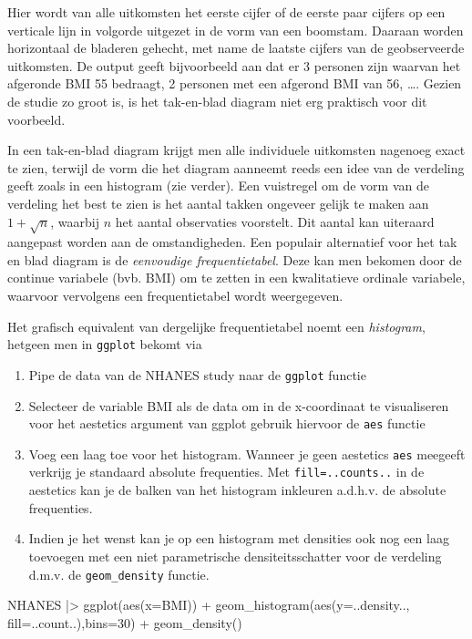 \documentclass[
  dutch,
  letterpaper,
  12pt]{book}
\newenvironment{Shaded}{\begin{snugshade}}{\end{snugshade}}
\newcommand{\AttributeTok}[1]{\textcolor[rgb]{0.40,0.45,0.13}{#1}}
\newcommand{\DecValTok}[1]{\textcolor[rgb]{0.68,0.00,0.00}{#1}}
\newcommand{\FunctionTok}[1]{\textcolor[rgb]{0.28,0.35,0.67}{#1}}
\newcommand{\NormalTok}[1]{\textcolor[rgb]{0.00,0.23,0.31}{#1}}
\newcommand{\SpecialCharTok}[1]{\textcolor[rgb]{0.37,0.37,0.37}{#1}}
\providecommand{\tightlist}{%
  \setlength{\itemsep}{0pt}\setlength{\parskip}{0pt}}
\theoremstyle{definition}
\theoremstyle{definition}
\theoremstyle{definition}
\theoremstyle{remark}
\begin{document}
Hier wordt van alle uitkomsten het eerste cijfer of de eerste paar
cijfers op een verticale lijn in volgorde uitgezet in de vorm van een
boomstam. Daaraan worden horizontaal de bladeren gehecht, met name de
laatste cijfers van de geobserveerde uitkomsten. De output geeft
bijvoorbeeld aan dat er 3 personen zijn waarvan het afgeronde BMI 55
bedraagt, 2 personen met een afgerond BMI van 56, \ldots. Gezien de
studie zo groot is, is het tak-en-blad diagram niet erg praktisch voor
dit voorbeeld.

In een tak-en-blad diagram krijgt men alle individuele uitkomsten
nagenoeg exact te zien, terwijl de vorm die het diagram aanneemt reeds
een idee van de verdeling geeft zoals in een histogram (zie verder). Een
vuistregel om de vorm van de verdeling het best te zien is het aantal
takken ongeveer gelijk te maken aan \(1 + \sqrt{n}\), waarbij \(n\) het
aantal observaties voorstelt. Dit aantal kan uiteraard aangepast worden
aan de omstandigheden. Een populair alternatief voor het tak en blad
diagram is de \emph{eenvoudige frequentietabel}. Deze kan men bekomen
door de continue variabele (bvb. BMI) om te zetten in een kwalitatieve
ordinale variabele, waarvoor vervolgens een frequentietabel wordt
weergegeven.

Het grafisch equivalent van dergelijke frequentietabel noemt een
\emph{histogram}, hetgeen men in \texttt{ggplot} bekomt via

\begin{enumerate}
\def\labelenumi{\arabic{enumi}.}
\tightlist
\item
  Pipe de data van de NHANES study naar de \texttt{ggplot} functie
\item
  Selecteer de variable BMI als de data om in de x-coordinaat te
  visualiseren voor het aestetics argument van ggplot gebruik hiervoor
  de \texttt{aes} functie
\item
  Voeg een laag toe voor het histogram. Wanneer je geen aestetics
  \texttt{aes} meegeeft verkrijg je standaard absolute frequenties. Met
  \texttt{fill=..counts..} in de aestetics kan je de balken van het
  histogram inkleuren a.d.h.v. de absolute frequenties.
\item
  Indien je het wenst kan je op een histogram met densities ook nog een
  laag toevoegen met een niet parametrische densiteitsschatter voor de
  verdeling d.m.v. de \texttt{geom\_density} functie.
\end{enumerate}

\begin{Shaded}
\begin{Highlighting}[]
\NormalTok{NHANES }\SpecialCharTok{|\textgreater{}}
  \FunctionTok{ggplot}\NormalTok{(}\FunctionTok{aes}\NormalTok{(}\AttributeTok{x=}\NormalTok{BMI)) }\SpecialCharTok{+}
  \FunctionTok{geom\_histogram}\NormalTok{(}\FunctionTok{aes}\NormalTok{(}\AttributeTok{y=}\NormalTok{..density.., }\AttributeTok{fill=}\NormalTok{..count..),}\AttributeTok{bins=}\DecValTok{30}\NormalTok{) }\SpecialCharTok{+}
  \FunctionTok{geom\_density}\NormalTok{()}
\end{Highlighting}
\end{Shaded}
\end{document}
